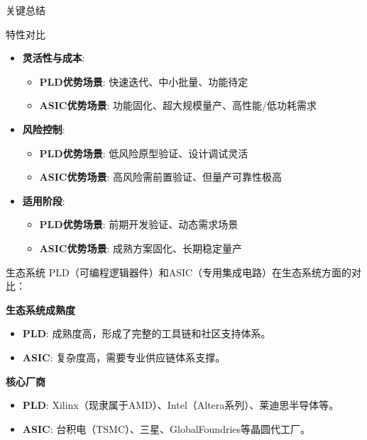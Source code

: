 \documentclass[
  ignorenonframetext,
  chinese,
]{beamer}
\providecommand{\tightlist}{%
  \setlength{\itemsep}{0pt}\setlength{\parskip}{0pt}}
\begin{document}
\begin{frame}
\begin{block}{关键总结}
\label{ux5173ux952eux603bux7ed3}
\end{block}

\begin{block}{特性对比}
\label{ux7279ux6027ux5bf9ux6bd4}
\begin{itemize}
\tightlist
\item
  \textbf{灵活性与成本}:

  \begin{itemize}
  \tightlist
  \item
    \textbf{PLD优势场景}: 快速迭代、中小批量、功能待定
  \item
    \textbf{ASIC优势场景}: 功能固化、超大规模量产、高性能/低功耗需求
  \end{itemize}
\item
  \textbf{风险控制}:

  \begin{itemize}
  \tightlist
  \item
    \textbf{PLD优势场景}: 低风险原型验证、设计调试灵活
  \item
    \textbf{ASIC优势场景}: 高风险需前置验证、但量产可靠性极高
  \end{itemize}
\item
  \textbf{适用阶段}:

  \begin{itemize}
  \tightlist
  \item
    \textbf{PLD优势场景}: 前期开发验证、动态需求场景
  \item
    \textbf{ASIC优势场景}: 成熟方案固化、长期稳定量产
  \end{itemize}
\end{itemize}
\end{block}
\end{frame}

\begin{frame}
\begin{block}{生态系统}
\label{ux751fux6001ux7cfbux7edf}
PLD（可编程逻辑器件）和ASIC（专用集成电路）在生态系统方面的对比：

\textbf{生态系统成熟度}

\begin{itemize}
\tightlist
\item
  \textbf{PLD}: 成熟度高，形成了完整的工具链和社区支持体系。\\
\item
  \textbf{ASIC}: 复杂度高，需要专业供应链体系支撑。
\end{itemize}

\textbf{核心厂商}

\begin{itemize}
\tightlist
\item
  \textbf{PLD}:
  Xilinx（现隶属于AMD）、Intel（Altera系列）、莱迪思半导体等。\\
\item
  \textbf{ASIC}: 台积电（TSMC）、三星、GlobalFoundries等晶圆代工厂。
\end{itemize}
\end{block}
\end{frame}
\end{document}
